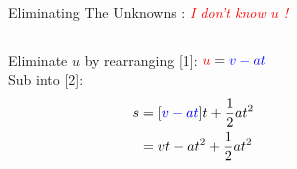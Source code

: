 \begin{frame}{ Eliminating The Unknowns  : \textit{\textcolor{red}{I don't know $u$ !} }}
\small

\begin{columns}[T]
\begin{column}{0.7\textwidth}
Eliminate $u$ by rearranging [1]: $\textcolor{red}{u}= \textcolor{blue}{ v - at}$\\[1ex]
Sub into [2]: 
\begin{equation}\nonumber
\begin{split}
s  &= [\textcolor{blue}{ v - at}] t + \frac{1}{2} at^2  \\
& = vt - at^2 + \frac{1}{2} at^2 \\
\end{split}
\end{equation}
\end{column}\hfill

\begin{column}{0.3\textwidth}
       
 \\[1ex] 
 \\[3ex] 
\end{column}
\end{columns}

\vspace{0.5cm}
  \\[1ex]

\end{frame}


% 
%
%

